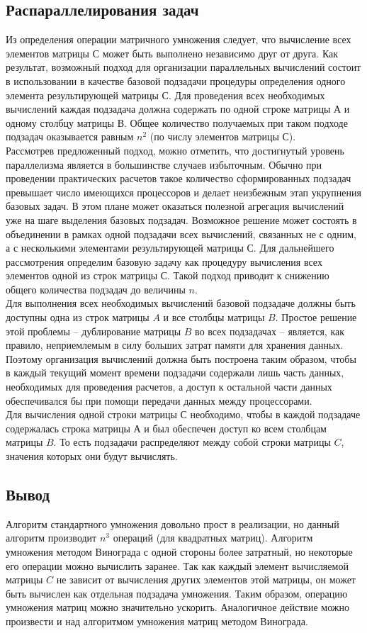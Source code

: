 \documentclass[a4paper,12pt]{article}
\begin{document}
\subsection{Распараллелирования задач}
Из определения операции матричного умножения следует, что вычисление всех элементов матрицы $С$ может быть выполнено независимо друг от друга. Как результат, возможный подход для организации параллельных вычислений состоит в использовании в качестве базовой подзадачи процедуры определения одного элемента результирующей матрицы $С$. Для проведения всех необходимых вычислений каждая подзадача должна содержать по одной строке матрицы $А$ и одному столбцу матрицы $В$. Общее количество получаемых при таком подходе подзадач оказывается равным $n^2$ (по числу элементов матрицы $С$).
\\
Рассмотрев предложенный подход, можно отметить, что достигнутый уровень параллелизма является в большинстве случаев избыточным. Обычно при проведении практических расчетов такое количество сформированных подзадач превышает число имеющихся процессоров и делает неизбежным этап укрупнения базовых задач. В этом плане может оказаться полезной агрегация вычислений уже на шаге выделения базовых подзадач. Возможное решение может состоять в объединении в рамках одной подзадачи всех вычислений, связанных не с одним, а с несколькими элементами результирующей матрицы $С$. Для дальнейшего рассмотрения определим базовую задачу как процедуру вычисления всех элементов одной из строк матрицы $С$. Такой подход приводит к снижению общего количества подзадач до величины $n$.
\\
Для выполнения всех необходимых вычислений базовой подзадаче должны быть доступны одна из строк матрицы $A$ и все столбцы матрицы $B$. Простое решение этой проблемы – дублирование матрицы $B$ во всех подзадачах – является, как правило, неприемлемым в силу больших затрат памяти для хранения данных. Поэтому организация вычислений должна быть построена таким образом, чтобы в каждый текущий момент времени подзадачи содержали лишь часть данных, необходимых для проведения расчетов, а доступ к остальной части данных обеспечивался бы при помощи передачи данных между процессорами. 
\\
Для вычисления одной строки матрицы $С$ необходимо, чтобы в каждой подзадаче содержалась строка матрицы $А$ и был обеспечен доступ ко всем столбцам матрицы $B$. То есть подзадачи распределяют между собой строки матрицы $C$, значения которых они будут вычислять\cite{McConnell}.

\newpage
\subsection{Вывод}
Алгоритм стандартного умножения довольно прост в реализации, но данный алгоритм производит $n^3$ операций (для квадратных матриц). Алгоритм умножения методом Винограда с одной стороны более затратный, но некоторые его операции можно вычислить заранее. Так как каждый элемент вычисляемой матрицы $C$ не зависит от вычисления других элементов этой матрицы, он может быть вычислен как отдельная подзадача умножения. Таким образом, операцию умножения матриц можно значительно ускорить. Аналогичное действие можно произвести и над алгоритмом умножения матриц методом Винограда.
\end{document}
